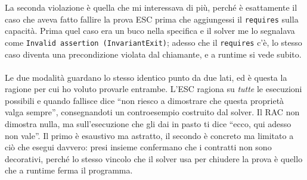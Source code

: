 La seconda violazione è quella che mi interessava di più, perché è esattamente il caso
che aveva fatto fallire la prova ESC prima che aggiungessi il \texttt{requires} sulla
capacità. Prima quel caso era un buco nella specifica e il solver me lo segnalava come
\texttt{Invalid assertion (InvariantExit)}; adesso che il \texttt{requires} c'è, lo stesso
caso diventa una precondizione violata dal chiamante, e a runtime si vede subito.
\\ \\
Le due modalità guardano lo stesso identico punto da due lati, ed è questa la ragione per
cui ho voluto provarle entrambe. L'ESC ragiona su \emph{tutte} le esecuzioni possibili e
quando fallisce dice ``non riesco a dimostrare che questa proprietà valga sempre'',
consegnandoti un controesempio costruito dal solver. Il RAC non dimostra nulla, ma
sull'esecuzione che gli dai in pasto ti dice ``ecco, qui adesso non vale''. Il primo è
esaustivo ma astratto, il secondo è concreto ma limitato a ciò che esegui davvero: presi
insieme confermano che i contratti non sono decorativi, perché lo stesso vincolo che il
solver usa per chiudere la prova è quello che a runtime ferma il programma.
